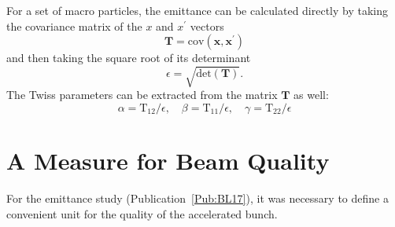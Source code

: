 For a set of macro particles, the emittance can be calculated directly by taking the covariance matrix of the $x$ and $x^{\prime}$ vectors
\begin{equation}
    \mathbf{T} = \mathrm{cov}\left(\mathbf{x}, \mathbf{x}^{\prime}\right)
\end{equation}
and then taking the square root of its determinant
\begin{equation}
    \epsilon = \sqrt{\mathrm{det}\left(\mathbf{T}\right)}.
\end{equation}
The Twiss parameters can be extracted from the matrix $\mathbf{T}$ as well:
\begin{equation}
    \alpha = \mathrm{T}_{12}/\epsilon, \quad
    \beta  = \mathrm{T}_{11}/\epsilon, \quad
    \gamma = \mathrm{T}_{22}/\epsilon
\end{equation}

\section{A Measure for Beam Quality}
\label{Apx:SA:QTilde}

For the emittance study (Publication~\ref{Pub:BL17}), it was necessary to define a convenient unit for the quality of the accelerated bunch.


